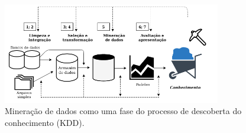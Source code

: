 \begin{figure}[h]
    \centering
    \caption{Mineração de dados como uma fase do processo de descoberta do conhecimento (KDD).}
    \begin{center}
        \includegraphics[width=0.85\textwidth]{img/based-on-figure-1-4-han-2011.png}
    \end{center}
    \vspace{-0.5cm}
    \label{fig:diagrama-mineração-texto-han}
\end{figure}